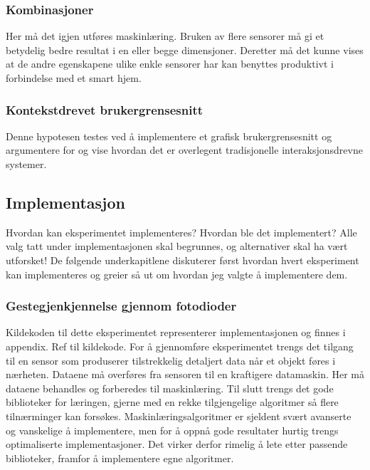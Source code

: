 \subsubsection*{Kombinasjoner}
Her må det igjen utføres maskinlæring. Bruken av flere sensorer må gi et betydelig bedre resultat i en eller begge dimensjoner. Deretter må det kunne vises at de andre egenskapene ulike enkle sensorer har kan benyttes produktivt i forbindelse med et smart hjem.

\subsubsection*{Kontekstdrevet brukergrensesnitt}
Denne hypotesen testes ved å implementere et grafisk brukergrensesnitt og argumentere for og vise hvordan det er overlegent tradisjonelle interaksjonsdrevne systemer.





\subsection{Implementasjon}
{\color{red}Hvordan kan eksperimentet implementeres? Hvordan ble det implementert? Alle valg tatt under implementasjonen skal begrunnes, og alternativer skal ha vært utforsket!}
De følgende underkapitlene diskuterer først hvordan hvert eksperiment kan implementeres og greier så ut om hvordan jeg valgte å implementere dem.

\subsubsection{Gestegjenkjennelse gjennom fotodioder}
{\color{red}Kildekoden til dette eksperimentet representerer implementasjonen og finnes i appendix. Ref til kildekode.}
For å gjennomføre eksperimentet trengs det tilgang til en sensor som produserer tilstrekkelig detaljert data når et objekt føres i nærheten. Dataene må overføres fra sensoren til en kraftigere datamaskin. Her må dataene behandles og forberedes til maskinlæring. Til slutt trengs det gode biblioteker for læringen, gjerne med en rekke tilgjengelige algoritmer så flere tilnærminger kan forsøkes. Maskinlæringsalgoritmer er sjeldent svært avanserte og vanskelige å implementere, men for å oppnå gode resultater hurtig trengs optimaliserte implementasjoner. Det virker derfor rimelig å lete etter passende biblioteker, framfor å implementere egne algoritmer.

